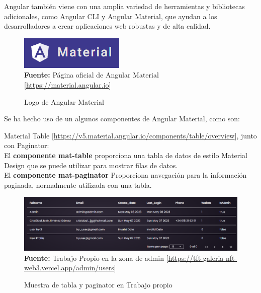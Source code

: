 Angular también viene con una amplia variedad de herramientas y bibliotecas
adicionales, como Angular CLI y Angular Material, que ayudan a los
desarrolladores a crear aplicaciones web robustas y de alta calidad.
\begin{figure}[htb!]
    \centering
    \caption{Logo de Angular Material}
    \label{fig:angularMat-logo}
    \centering
    \includegraphics[scale=1]{./Ilustraciones/logos/Angular-Mat Logo.png}\\
    \textbf{Fuente:} Página oficial de Angular Material [\url{https://material.angular.io}]
\end{figure}
\hfill \break
Se ha hecho uso de un algunos componentes de Angular Material, como son:

Material Table
    [\url{https://v5.material.angular.io/components/table/overview}], junto con
Paginator:\\ El \textbf{componente mat-table} proporciona una tabla de datos de
estilo Material Design que se puede utilizar para mostrar filas de datos. \\ El
\textbf{componente mat-paginator} Proporciona navegación para la información
paginada, normalmente utilizada con una tabla.
\begin{figure}[htb!]
    \centering
    \caption{Muestra de tabla y paginator en Trabajo propio}
    \label{fig:tabla}
    \centering
    \includegraphics[scale=0.5]{./Ilustraciones/table-paginator.png}\\
    \textbf{Fuente:} Trabajo Propio en la zona de admin [\url{https://tft-galeria-nft-web3.vercel.app/admin/users}]
\end{figure}
\hfill \break